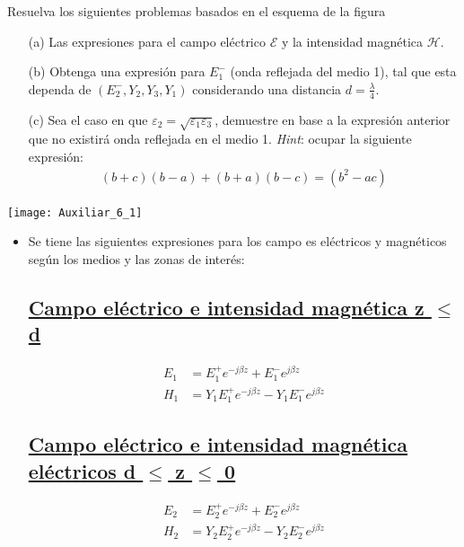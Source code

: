 \documentclass[
  11pt,
  letterpaper,
   addpoints,
   answers
  ]{exam}
\begin{document}
\vspace{0.5cm}
\noindent
\vspace{.85cm}
\begin{questions}
    \question Resuelva los siguientes problemas basados en el esquema de la figura
    \begin{itemize}
    \item[(a)] Las expresiones para el campo eléctrico $\mathcal{E}$ y la intensidad magnética $\mathcal{H}$.
    
    \item[(b)] Obtenga una expresión para $E_1^{-}$ (onda reflejada del medio 1), tal que esta dependa de $(E_2^{-}, Y_2, Y_3, Y_1)$ considerando una distancia $d = \frac{\lambda}{4}$.
    
    \item[(c)] Sea el caso en que $\varepsilon_2 = \sqrt{\varepsilon_1 \varepsilon_3}$, demuestre en base a la expresión anterior que no existirá onda reflejada en el medio 1. \textit{Hint}: ocupar la siguiente expresión:
    \begin{align}
    (b + c)(b - a) + (b + a)(b - c) = (b^2 - ac) \tag{1}
    \end{align}
\end{itemize}
  \begin{center}
        \texttt{[image: Auxiliar\_6\_1]}
      \end{center}
    \begin{solution}
        \begin{itemize}
            \item Se tiene las siguientes expresiones para los campo es eléctricos y magnéticos según los medios y las zonas de interés:
\subsection*{\underline{Campo eléctrico e intensidad magnética z $\leq$ d}}
\begin{align}
    E_{1}&= E_{1}^{+}e^{-j\beta z} + E_{1}^{-}e^{j\beta z}\\
    H_{1}&= Y_{1}E_{1}^{+}e^{-j\beta z} - Y_{1}E_{1}^{-}e^{j\beta z}
\end{align}
\subsection*{\underline{Campo eléctrico e intensidad magnética eléctricos d $\leq$ z $\leq$ 0}}
\begin{align}
    E_{2}&= E_{2}^{+}e^{-j\beta z} + E_{2}^{-}e^{j\beta z}\\
    H_{2}&= Y_{2}E_{2}^{+}e^{-j\beta z} - Y_{2}E_{2}^{-}e^{j\beta z}
\end{align}

\end{itemize}
\end{solution}
\end{questions}
\end{document}
